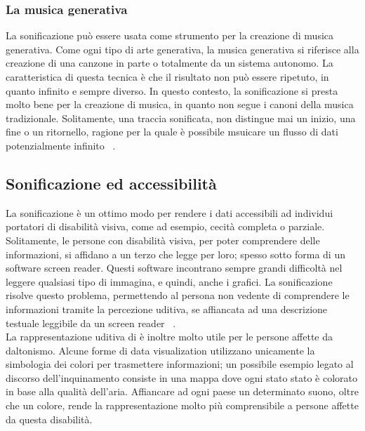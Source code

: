 \subsubsection{La musica generativa}
La sonificazione può essere usata come strumento per la creazione di musica generativa.
Come ogni tipo di arte generativa, la musica generativa si riferisce alla creazione di una canzone in parte o totalmente da un sistema autonomo.
La caratteristica di questa tecnica è che il risultato non può essere ripetuto, in quanto infinito e sempre diverso.
In questo contesto, la sonificazione si presta molto bene per la creazione di musica, in quanto non segue i canoni della musica tradizionale.
Solitamente, una traccia sonificata, non distingue mai un inizio, una fine o un ritornello, ragione per la quale è possibile msuicare un flusso di dati potenzialmente infinito ~\cite{generative_music}.

\subsection{Sonificazione ed accessibilità}
La sonificazione è un ottimo modo per rendere i dati accessibili ad individui portatori di disabilità visiva, come ad esempio, cecità completa o parziale.
Solitamente, le persone con disabilità visiva, per poter comprendere delle informazioni, si affidano a un terzo che legge per loro; spesso sotto forma di un software screen reader.
Questi software incontrano sempre grandi difficoltà nel leggere qualsiasi tipo di immagina, e quindi, anche i grafici.
La sonificazione risolve questo problema, permettendo al persona non vedente di comprendere le informazioni tramite la percezione uditiva, se affiancata ad una descrizione testuale leggibile da un screen reader ~\cite{accessibility}.
\\
La rappresentazione uditiva di è inoltre molto utile per le persone affette da daltonismo.
Alcune forme di data visualization utilizzano unicamente la simbologia dei colori per trasmettere informazioni; un possibile esempio legato al discorso dell'inquinamento consiste in una mappa dove ogni stato stato è colorato in base alla qualità dell'aria.
Affiancare ad ogni paese un determinato suono, oltre che un colore, rende la rappresentazione molto più comprensibile a persone affette da questa disabilità.


